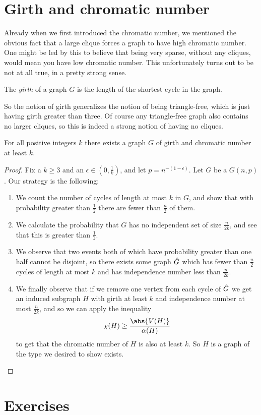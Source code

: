 \documentclass[nobib]{tufte-handout}
\begin{document}
\section{Girth and chromatic number}

Already when we first introduced the chromatic number, we mentioned the obvious fact that a large clique forces a graph to have high chromatic number. One might be led by this to believe that being very sparse, without any cliques, would mean you have low chromatic number. This unfortunately turns out to be not at all true, in a pretty strong sense.

\begin{definition}
  The \emph{girth} of a graph $G$ is the length of the shortest cycle in the graph.
\end{definition}

So the notion of girth generalizes the notion of being triangle-free, which is just having girth greater than three. Of course any triangle-free graph also contains no larger cliques, so this is indeed a strong notion of having no cliques.

\begin{theorem}[Erd\H{o}s, 1959]
  For all positive integers $k$ there exists a graph $G$ of girth and chromatic number at least $k$.

  \begin{proof}
    Fix a $k \geq 3$ and an $\epsilon \in \left(0, \frac{1}{k}\right)$, and let $p = n^{-(1-\epsilon)}$. Let $G$ be a $G(n,p)$. Our strategy is the following:
    \begin{enumerate}
      \item We count the number of cycles of length at most $k$ in $G$, and show that with probability greater than $\frac{1}{2}$ there are fewer than $\frac{n}{2}$ of them.
      \item We calculate the probability that $G$ has no independent set of size $\frac{n}{2k}$, and see that this is greater than $\frac{1}{2}$.
      \item We observe that two events both of which have probability greater than one half cannot be disjoint, so there exists some graph $\Hat G$ which has fewer than $\frac{n}{2}$ cycles of length at most $k$ and has independence number less than $\frac{n}{2k}$.
      \item We finally observe that if we remove one vertex from each cycle of $\Hat G$ we get an induced subgraph $H$ with girth at least $k$ and independence number at most $\frac{n}{2k}$, and so we can apply the inequality
      $$\chi(H) \geq \frac{\abs{V(H)}}{\alpha(H)}$$
      to get that the chromatic number of $H$ is also at least $k$. So $H$ is a graph of the type we desired to show exists.
    \end{enumerate}
  \end{proof}
\end{theorem}

\section{Exercises}


%
%
\end{document}
